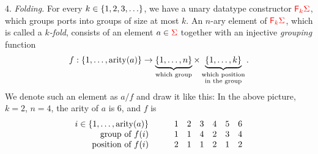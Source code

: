 \begin{definition}[Datatypes]
     4. \emph{Folding.} For every $k \in \{1,2,3,\ldots\}$, we have a unary datatype constructor ${\color{red}{\mathsf F_{k}}}{\color{red}{\Sigma}}$, which groups ports into groups of size at most $k$.  An $n$-ary element of ${\color{red}{\mathsf F_{k}}}{\color{red}{\Sigma}}$, which is called a \emph{$k$-fold}, consists of an element      $a \in {\color{red}{\Sigma}}$  together with an  injective \emph{grouping}  function
            \begin{align*}
                f : \{1,\ldots,\mathrm{arity}(a)\} \to \underbrace{\{1,\ldots,n\}}_{\text{which group}} \times  \underbrace{\{1,\ldots,k\}}_{\substack{\text{which position}\\ \text{in the group}}}.
            \end{align*}
            We denote such an element as $a/f$ and draw it like this: 
            In the above picture, $k=2$, $n=4$, the arity of $a$ is 6, and $f$ is
            \begin{align*}
            \begin{array}{rccccccc}
                i \in \{1,\ldots,\mathrm{arity}(a)\} &  \quad &1 & 2 & 3 & 4 & 5 & 6\\
                \text{group of $f(i)$} &  & 1 & 1 & 4 & 2 & 3 & 4\\
                \text{position of $f(i)$} & & 2 & 1 & 1 & 2 & 1 & 2 
            \end{array}
            \end{align*}
    
                    
\end{definition}

